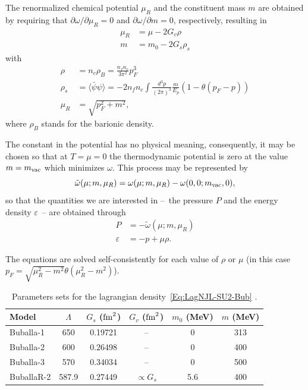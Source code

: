 \documentclass[prc, reprint, amsmath, floatfix,10pt]{revtex4-1}
\begin{document}
The renormalized chemical potential $\mu_R$ and the constituent mass $m$ are obtained by requiring that $\partial \omega / \partial \mu_R = 0$ and $\partial \omega / \partial m = 0$, respectively, resulting in
\begin{align}
	\mu_R &= \mu - 2 G_v \rho \\
	m &= m_0 - 2 G_s \rho_s
\end{align}
%
with
\begin{align}
	\rho &= n_c \rho_B = \frac{n_f n_c}{3\pi^2} p_F^3 \\
	\rho_s &= \langle \bar\psi\psi\rangle = - 2 n_f n_c \int\frac{d^3p}{(2\pi)^3} \frac{m}{E_p}(1 - \theta(p_F - p)) \\
	\mu_R &= \sqrt{p_F^2 + m^2},
\end{align}
%
where $\rho_B$ stands for the barionic density.

The constant in the potential has no physical meaning, consequently, it may be chosen so that at $T = \mu = 0$ the thermodynamic potential is zero at the value $m = m_{\rm{vac}}$ which minimizes $\omega$. This process may be represented by 
\begin{equation}
	\tilde\omega(\mu; m, \mu_R) = \omega(\mu; m, \mu_R) - \omega(0, 0; m_{\rm{vac}}, 0),
\end{equation}
%
so that the quantities we are interested in --~the pressure $P$ and the energy density $\varepsilon$~-- are obtained through
\begin{align}
		P &= -\tilde\omega(\mu; m, \mu_R) \label{Exp_pressao_T}\\
		\varepsilon &= -p + \mu \rho. \label{Exp_energia_T}
\end{align}
	
The equations are solved self-consistently for each value of $\rho$ or $\mu$ (in this case $p_F = \sqrt{\mu_R^2 - m^2}\theta(\mu_R^2 - m^2)$).

\begin{table}[!htpb]
\centering
\caption{Parameters sets for the lagrangian density~\eqref{Eq:LagNJL-SU2-Bub} \cite{Buballa1996, Buballa2005}. \label{Tab:Parametros_NJL}}
\begin{ruledtabular}
\begin{tabular}{lccccc}
Model &  $\Lambda$ & $G_s$ ($\rm{fm}^2$) & $G_v$ ($\rm{fm}^2$) & $m_0$ (MeV) & $m$ (MeV) \\
\hline
Buballa-1 & 650 & 0.19721 & -- & 0 & 313 \\
Buballa-2 & 600 & 0.26498 & -- & 0 & 400 \\
Buballa-3 & 570 & 0.34034 & -- & 0 & 500 \\
BuballaR-2 & 587.9 & 0.27449 & $\propto G_s$ & 5.6 & 400 \\
\end{tabular}
\end{ruledtabular}
\end{table}
\end{document}
